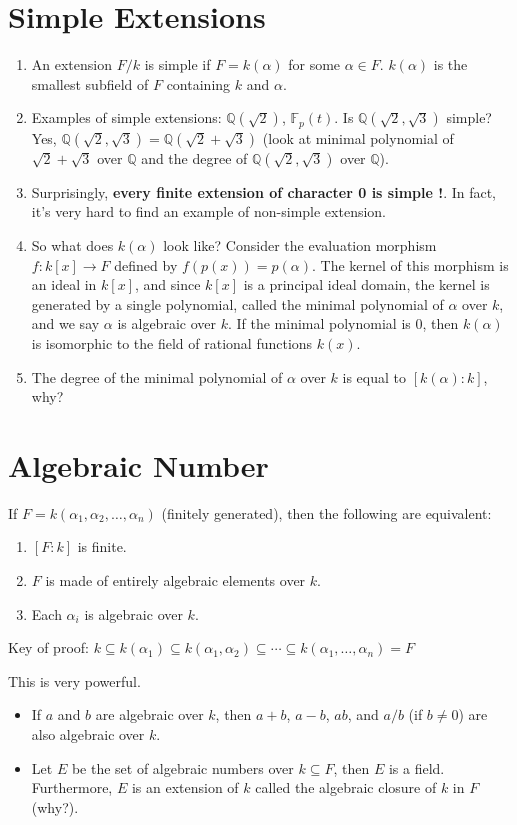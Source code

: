 \documentclass[15pt]{scrartcl}
\newcommand{\Q}{\mathbb{Q}}
\begin{document}
\section{Simple Extensions}
\begin{enumerate}
    \item An extension $F/k$ is simple if $F = k(\alpha)$ for some $\alpha \in F$. $k(\alpha)$ is the smallest subfield of $F$ containing $k$ and $\alpha$.
    \item Examples of simple extensions: $\Q(\sqrt{2})$, $\mathbb{F}_p(t)$. Is $\Q(\sqrt{2}, \sqrt{3})$ simple? Yes, $\Q(\sqrt{2}, \sqrt{3}) = \Q(\sqrt{2} + \sqrt{3})$ (look at minimal polynomial of $\sqrt{2} + \sqrt{3}$ over $\Q$ and the degree of $\Q(\sqrt{2}, \sqrt{3})$ over $\Q$).
    \item Surprisingly, \textbf{every finite extension of character 0 is simple !}. In fact, it's very hard to find an example of non-simple extension.
    \item So what does $k(\alpha)$ look like? Consider the evaluation morphism $f: k[x] \to F$ defined by $f(p(x)) = p(\alpha)$. The kernel of this morphism is an ideal in $k[x]$, and since $k[x]$ is a principal ideal domain, the kernel is generated by a single polynomial, called the minimal polynomial of $\alpha$ over $k$, and we say $\alpha$ is algebraic over $k$. If the minimal polynomial is $0$, then $k(\alpha)$ is isomorphic to the field of rational functions $k(x)$. 
    \item The degree of the minimal polynomial of $\alpha$ over $k$ is equal to $[k(\alpha):k]$, why?
\end{enumerate}
\section{Algebraic Number}
If $F=k(\alpha_1, \alpha_2, \ldots, \alpha_n)$ (finitely generated), then the following are equivalent:
\begin{enumerate}
    \item $[F:k]$ is finite.
    \item $F$ is made of entirely algebraic elements over $k$.
    \item Each $\alpha_i$ is algebraic over $k$.
\end{enumerate}
Key of proof: $k \subseteq k(\alpha_1) \subseteq k(\alpha_1,\alpha_2) \subseteq \cdots \subseteq k(\alpha_1,\ldots,\alpha_n) = F$
\begin{remark}
    This is very powerful. 
\begin{itemize}
    \item If $a$ and $b$ are algebraic over $k$, then $a+b$, $a-b$, $ab$, and $a/b$ (if $b \neq 0$) are also algebraic over $k$.
    \item Let $E$ be the set of algebraic numbers over $k\subseteq F$, then $E$ is a field. Furthermore, $E$ is an extension of $k$ called the algebraic closure of $k$ in $F$ (why?).
\end{itemize}

\end{remark}
\end{document}
